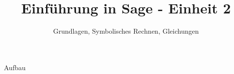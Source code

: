 \documentclass[hyperref={xetex}]{beamer}
\title{Einführung in Sage - Einheit 2}
\subtitle{Grundlagen, Symbolisches Rechnen, Gleichungen}
\begin{document}
\titlepage

\begin{frame}{Aufbau}
\tableofcontents
\end{frame}




\end{document}
